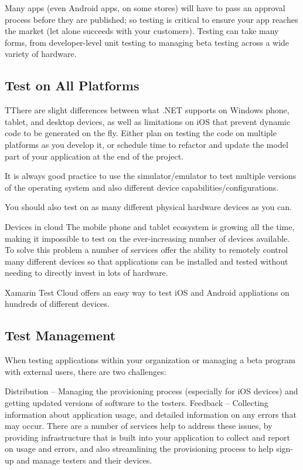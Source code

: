 Many apps (even Android apps, on some stores) will have to pass an approval process before they are published; so testing is critical to ensure your app reaches the market (let alone succeeds with your customers). Testing can take many forms, from developer-level unit testing to managing beta testing across a wide variety of hardware.




\subsection{Test on All Platforms}

TThere are slight differences between what .NET supports on Windows phone, tablet, and desktop devices, as well as limitations on iOS that prevent dynamic code to be generated on the fly. Either plan on testing the code on multiple platforms as you develop it, or schedule time to refactor and update the model part of your application at the end of the project.

It is always good practice to use the simulator/emulator to test multiple versions of the operating system and also different device capabilities/configurations.

You should also test on as many different physical hardware devices as you can.


Devices in cloud
The mobile phone and tablet ecosystem is growing all the time, making it impossible to test on the ever-increasing number of devices available. To solve this problem a number of services offer the ability to remotely control many different devices so that applications can be installed and tested without needing to directly invest in lots of hardware.

Xamarin Test Cloud offers an easy way to test iOS and Android appliations on hundreds of different devices.


\subsection{Test Management}

When testing applications within your organization or managing a beta program with external users, there are two challenges:

Distribution – Managing the provisioning process (especially for iOS devices) and getting updated versions of software to the testers.
Feedback – Collecting information about application usage, and detailed information on any errors that may occur.
There are a number of services help to address these issues, by providing infrastructure that is built into your application to collect and report on usage and errors, and also streamlining the provisioning process to help sign-up and manage testers and their devices.

